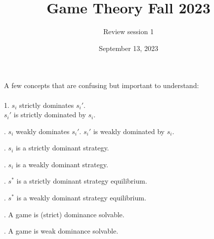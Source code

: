 \documentclass{article}
\title{Game Theory Fall 2023}
\author{Review session 1}
\date{September 13, 2023}
\begin{document}
\maketitle

\noindent A few concepts that are confusing but important to understand:\\\\
1. $s_{i}$ strictly dominates $s_{i}'$.\\
$s_{i}'$ is strictly dominated by $s_{i}$.
\vspace*{6\baselineskip}

. $s_{i}$ weakly dominates $s_{i}'$.
$s_{i}'$ is weakly dominated by $s_{i}$.
\vspace*{6\baselineskip}

. $s_{i}$ is a strictly dominant strategy.
\vspace*{6\baselineskip}

. $s_{i}$ is a weakly dominant strategy.
\vspace*{6\baselineskip}

\newpage
{}. $s^{*}$ is a strictly dominant strategy equilibrium.
\vspace*{6\baselineskip}

. $s^{*}$ is a weakly dominant strategy equilibrium.
\vspace*{6\baselineskip}

. A game is (strict) dominance solvable.
\vspace*{6\baselineskip}

. A game is weak dominance solvable.
\end{document}
